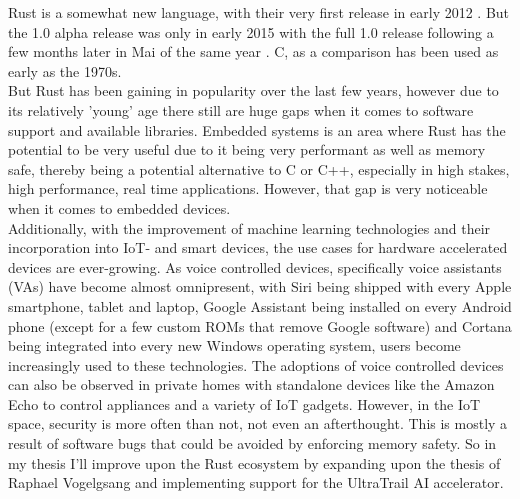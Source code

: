 

Rust \cite{rustlang} is a somewhat new language,
with their very first release in early 2012 \cite{rust_releases}.
But the 1.0 alpha release was only in early 2015 \cite{rust_releases}
with the full 1.0 release following a few months later in Mai of the same year \cite{rust_releases}.
C, as a comparison has been used as early as the 1970s.\\
But Rust has been gaining in popularity \cite{rust_popularity} over the last few years, however
due to its relatively 'young' age there still are huge gaps when it comes to software support and available libraries.
Embedded systems is an area where Rust has the potential to be very useful due to it being very performant as well as memory safe,
thereby being a potential alternative to C or C++, especially in high stakes, high performance, real time applications.
However, that gap is very noticeable when it comes to embedded devices.\\
Additionally, with the improvement of machine learning technologies and their incorporation into IoT- and smart devices,
the use cases for hardware accelerated devices are ever-growing.
As voice controlled devices, specifically voice assistants (VAs) have become almost omnipresent,
with Siri being shipped with every Apple smartphone, tablet and laptop, Google Assistant being installed
on every Android phone (except for a few custom ROMs that remove Google software) and Cortana being integrated
into every new Windows operating system, users become increasingly used to these technologies.
The adoptions of voice controlled devices can also be observed in private homes with standalone
devices like the Amazon Echo to control appliances and a variety of IoT gadgets.
However, in the IoT space, security is more often than not, not even an afterthought.
This is mostly a result of software bugs that could be avoided by enforcing memory safety.
So in my thesis I'll improve upon the Rust ecosystem by expanding upon the thesis of Raphael Vogelgsang \cite{rust_pulp}
and implementing support for the UltraTrail \cite{ultratrail} AI accelerator.
\\\\
